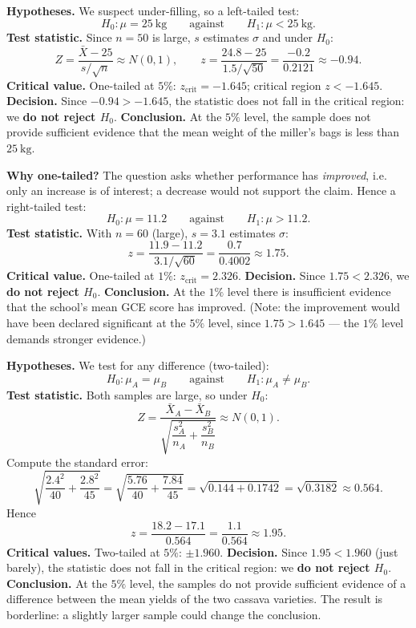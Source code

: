 \documentclass[11pt]{article}
\begin{document}
\begin{corrige}
\textbf{Hypotheses.} We suspect under-filling, so a left-tailed test:
\[ H_0:\mu=25\ \mathrm{kg}\qquad\text{against}\qquad H_1:\mu<25\ \mathrm{kg}. \]
\textbf{Test statistic.} Since $n=50$ is large, $s$ estimates $\sigma$ and under $H_0$:
\[ Z=\frac{\bar{X}-25}{s/\sqrt{n}}\approx N(0,1),\qquad z=\frac{24.8-25}{1.5/\sqrt{50}}=\frac{-0.2}{0.2121}\approx -0.94. \]
\textbf{Critical value.} One-tailed at $5\%$: $z_{\text{crit}}=-1.645$; critical region $z<-1.645$.
\textbf{Decision.} Since $-0.94>-1.645$, the statistic does not fall in the critical region: we \textbf{do not reject $H_0$}.
\textbf{Conclusion.} At the $5\%$ level, the sample does not provide sufficient evidence that the mean weight of the miller's bags is less than $25\ \mathrm{kg}$.
\end{corrige}

\begin{corrige}
\textbf{Why one-tailed?} The question asks whether performance has \emph{improved}, i.e. only an increase is of interest; a decrease would not support the claim. Hence a right-tailed test:
\[ H_0:\mu=11.2\qquad\text{against}\qquad H_1:\mu>11.2. \]
\textbf{Test statistic.} With $n=60$ (large), $s=3.1$ estimates $\sigma$:
\[ z=\frac{11.9-11.2}{3.1/\sqrt{60}}=\frac{0.7}{0.4002}\approx 1.75. \]
\textbf{Critical value.} One-tailed at $1\%$: $z_{\text{crit}}=2.326$.
\textbf{Decision.} Since $1.75<2.326$, we \textbf{do not reject $H_0$}.
\textbf{Conclusion.} At the $1\%$ level there is insufficient evidence that the school's mean GCE score has improved. (Note: the improvement would have been declared significant at the $5\%$ level, since $1.75>1.645$ --- the $1\%$ level demands stronger evidence.)
\end{corrige}

\begin{corrige}
\textbf{Hypotheses.} We test for any difference (two-tailed):
\[ H_0:\mu_A=\mu_B\qquad\text{against}\qquad H_1:\mu_A\neq\mu_B. \]
\textbf{Test statistic.} Both samples are large, so under $H_0$:
\[ Z=\frac{\bar{X}_A-\bar{X}_B}{\sqrt{\dfrac{s_A^2}{n_A}+\dfrac{s_B^2}{n_B}}}\approx N(0,1). \]
Compute the standard error:
\[ \sqrt{\frac{2.4^2}{40}+\frac{2.8^2}{45}}=\sqrt{\frac{5.76}{40}+\frac{7.84}{45}}=\sqrt{0.144+0.1742}=\sqrt{0.3182}\approx 0.564. \]
Hence
\[ z=\frac{18.2-17.1}{0.564}=\frac{1.1}{0.564}\approx 1.95. \]
\textbf{Critical values.} Two-tailed at $5\%$: $\pm 1.960$.
\textbf{Decision.} Since $1.95<1.960$ (just barely), the statistic does not fall in the critical region: we \textbf{do not reject $H_0$}.
\textbf{Conclusion.} At the $5\%$ level, the samples do not provide sufficient evidence of a difference between the mean yields of the two cassava varieties. The result is borderline: a slightly larger sample could change the conclusion.
\end{corrige}
\end{document}
